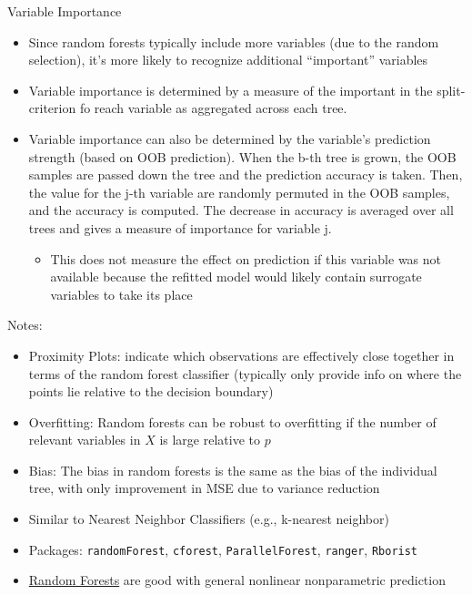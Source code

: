 \documentclass[
]{book}
\providecommand{\tightlist}{%
  \setlength{\itemsep}{0pt}\setlength{\parskip}{0pt}}
\begin{document}
Variable Importance

\begin{itemize}
\item
  Since random forests typically include more variables (due to the random selection), it's more likely to recognize additional ``important'' variables
\item
  Variable importance is determined by a measure of the important in the split-criterion fo reach variable as aggregated across each tree.
\item
  Variable importance can also be determined by the variable's prediction strength (based on OOB prediction). When the b-th tree is grown, the OOB samples are passed down the tree and the prediction accuracy is taken. Then, the value for the j-th variable are randomly permuted in the OOB samples, and the accuracy is computed. The decrease in accuracy is averaged over all trees and gives a measure of importance for variable j.

  \begin{itemize}
  \tightlist
  \item
    This does not measure the effect on prediction if this variable was not available because the refitted model would likely contain surrogate variables to take its place
  \end{itemize}
\end{itemize}

Notes:

\begin{itemize}
\item
  Proximity Plots: indicate which observations are effectively close together in terms of the random forest classifier (typically only provide info on where the points lie relative to the decision boundary)
\item
  Overfitting: Random forests can be robust to overfitting if the number of relevant variables in \(X\) is large relative to \(p\)
\item
  Bias: The bias in random forests is the same as the bias of the individual tree, with only improvement in MSE due to variance reduction
\item
  Similar to Nearest Neighbor Classifiers (e.g., k-nearest neighbor)
\item
  Packages: \texttt{randomForest}, \texttt{cforest}, \texttt{ParallelForest}, \texttt{ranger}, \texttt{Rborist}
\item
  \protect\hyperlink{random-forests}{Random Forests} are good with general nonlinear nonparametric prediction
\end{itemize}
\end{document}
